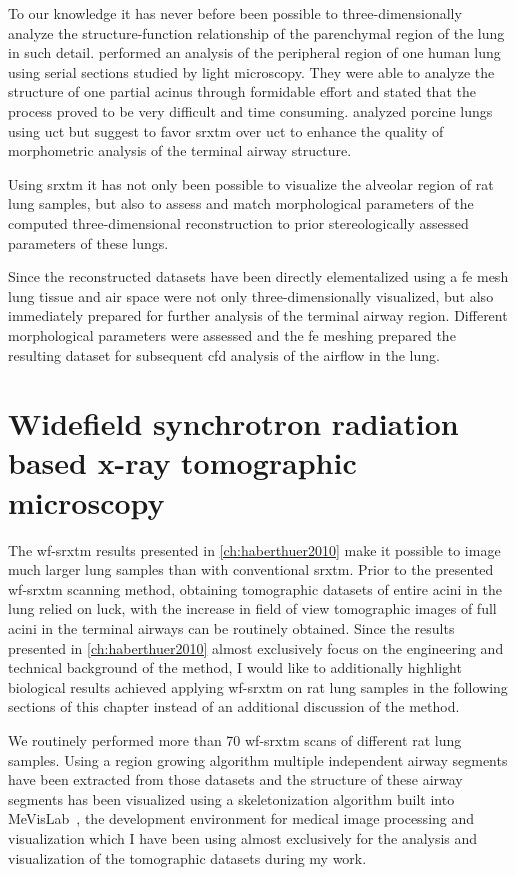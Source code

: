 To our knowledge it has never before been possible to three-dimensionally analyze the structure-function relationship of the parenchymal region of the lung in such detail. \citet{Berend1991} performed an analysis of the peripheral region of one human lung using serial sections studied by light microscopy. They were able to analyze the structure of one partial acinus through formidable effort and stated that the process proved to be very difficult and time consuming. \citet{Litzlbauer2006} analyzed porcine lungs using \ac{uct} but suggest to favor \ac{srxtm} over \ac{uct} to enhance the quality of morphometric analysis of the terminal airway structure.

Using \ac{srxtm} it has not only been possible to visualize the alveolar region of rat lung samples, but also to assess and match morphological parameters of the computed three-dimensional reconstruction to prior stereologically assessed parameters of these lungs.

Since the reconstructed datasets have been directly elementalized using a \ac{fe} mesh lung tissue and air space were not only three-dimensionally visualized, but also immediately prepared for further analysis of the terminal airway region. Different morphological parameters were assessed and the \ac{fe} meshing prepared the resulting dataset for subsequent \ac{cfd} analysis of the airflow in the lung.

\section[WF-SRXTM]{Widefield synchrotron radiation based x-ray tomographic microscopy}
The \ac{wf-srxtm} results presented in \autoref{ch:haberthuer2010} make it possible to image much larger lung samples than with conventional \ac{srxtm}. Prior to the presented \ac{wf-srxtm} scanning method, obtaining tomographic datasets of entire acini in the lung relied on luck, with the increase in field of view tomographic images of full acini in the terminal airways can be routinely obtained. Since the results presented in \autoref{ch:haberthuer2010} almost exclusively focus on the engineering and technical background of the method, I would like to additionally highlight biological results achieved applying \ac{wf-srxtm} on rat lung samples in the following sections of this chapter instead of an additional discussion of the method.

We routinely performed more than 70 \ac{wf-srxtm} scans of different rat lung samples. Using a region growing algorithm multiple independent airway segments have been extracted from those datasets and the structure of these airway segments has been visualized using a skeletonization algorithm built into MeVisLab~\cite{Bitter2007}, the development environment for medical image processing and visualization which I have been using almost exclusively for the analysis and visualization of the tomographic datasets during my work.

